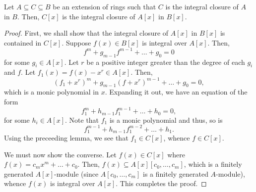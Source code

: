 \begin{theorem}
    Let $A\subseteq C\subseteq B$ be an extension of rings such that $C$ is the integral closure of $A$ in $B$. Then, $C[x]$ is the integral closure of $A[x]$ in $B[x]$.
\end{theorem}
\begin{proof}
    First, we shall show that the integral closure of $A[x]$ in $B[x]$ is contained in $C[x]$. Suppose $f(x)\in B[x]$ is integral over $A[x]$. Then, 
    \begin{equation*}
        f^m + g_{m - 1}f^{m - 1} + \dots + g_0 = 0
    \end{equation*}
    for some $g_i\in A[x]$. Let $r$ be a positive integer greater than the degree of each $g_i$ and $f$. Let $f_1(x) = f(x) - x^r\in A[x]$. Then, 
    \begin{equation*}
        (f_1 + x^r)^m + g_{m - 1}(f + x^r)^{m - 1} + \dots + g_0 = 0,
    \end{equation*}
    which is a monic polynomial in $x$. Expanding it out, we have an equation of the form 
    \begin{equation*}
        f_1^m + h_{m - 1}f_1^{m - 1} + \dots + h_0 = 0,
    \end{equation*}
    for some $h_i\in A[x]$. Note that $f_1$ is a monic polynomial and thus, so is 
    \begin{equation*}
        f_1^{m - 1} + h_{m - 1}f_1^{m - 2} + \dots + h_1.
    \end{equation*}
    Using the preceeding lemma, we see that $f_1\in C[x]$, whence $f\in C[x]$.

    We must now show the converse. Let $f(x)\in C[x]$ where $f(x) = c_mx^m + \dots + c_0$. Then, $f(x)\subseteq A[x][c_0,\dots,c_m]$, which is a finitely generated $A[x]$-module (since $A[c_0,\dots,c_m]$ is a finitely generated $A$-module), whence $f(x)$ is integral over $A[x]$. This completes the proof.
\end{proof}